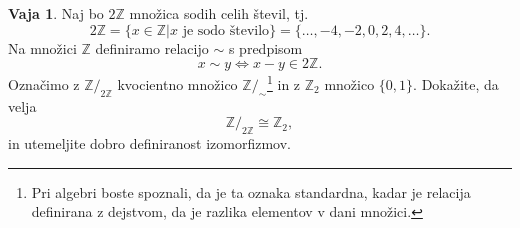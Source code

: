 \documentclass{article}
\newcommand{\NN}{\mathbb{N}}
\newcommand{\ZZ}{\mathbb{Z}}
\theoremstyle{definition}
\newtheorem{vaja}{Vaja}
\begin{document}




\begin{vaja}
	Naj bo $2\ZZ$ množica sodih celih števil, tj.\  
	$$2\ZZ = \{x \in \ZZ | x \text{ je sodo število}\} = \{\ldots, -4, -2, 0, 2, 4, \ldots\}.$$
	Na množici $\ZZ$ definiramo relacijo $\sim$ s predpisom
	\begin{equation*}
	x \sim y \iff x - y \in 2\ZZ.
	\end{equation*}
	Označimo z $\ZZ / _{2\ZZ}$ kvocientno množico $\ZZ / _\sim$\footnote{Pri algebri boste spoznali, da je ta oznaka standardna, kadar je relacija definirana z dejstvom, da je razlika elementov v dani množici.} in z $\ZZ_2 $ množico $ \{0,1\}$.
	Dokažite, da velja 
	$$ \ZZ / _{2\ZZ} \cong \ZZ_2,$$
	in utemeljite dobro definiranost izomorfizmov. 
\end{vaja}
\end{document}
